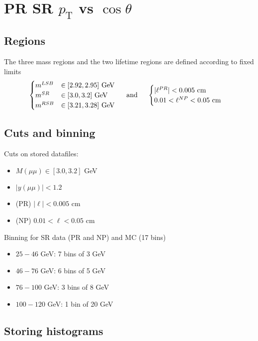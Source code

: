 \documentclass{article}
\newcommand{\pt}{p_\text{T}}
\newcommand{\cost}{\cos\theta}
\begin{document}
\pagebreak

\section{PR SR $\pt$ vs $\cost$}
\subsection{Regions} 

The three mass regions and the two lifetime regions are defined according to fixed limits
\begin{equation}\begin{cases}
m^{LSB}&\in[2.92, 2.95] \text{ GeV}\\
m^{SR}&\in[3.0, 3.2]  \text{ GeV}\\
m^{RSB}&\in[3.21, 3.28]  \text{ GeV}\\
\end{cases}\hspace{0.5cm}\text{and}\hspace{0.5cm}
\begin{cases}
|\ell^{PR}| < 0.005\text{ cm} \\
0.01 < \ell^{NP} < 0.05\text{ cm}
\end{cases}
\end{equation}

\subsection{Cuts and binning} 

Cuts on stored datafiles:
\begin{itemize}
\item $M(\mu\mu)\in[3.0,3.2]$ GeV
\item $|y(\mu\mu)|<1.2$
\item (PR) $|\ell|<0.005$ cm
\item (NP) $0.01 < \ell < 0.05$ cm
\end{itemize}

Binning for SR data (PR and NP) and MC (17 bins)
\begin{itemize}
\item $25-46$ GeV: 7 bins of 3 GeV
\item $46-76$ GeV: 6 bins of 5 GeV
\item $76-100$ GeV: 3 bins of 8 GeV
\item $100-120$ GeV: 1 bin of 20 GeV
\end{itemize}

\subsection{Storing histograms}
\end{document}
